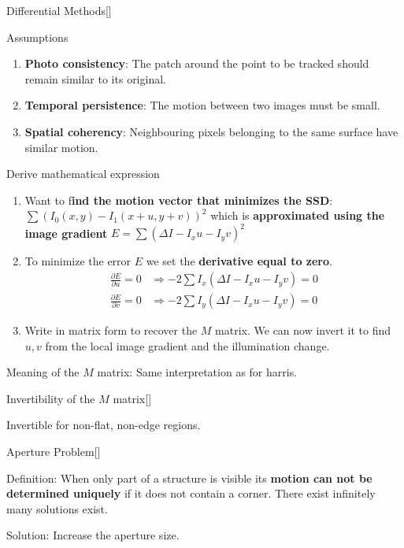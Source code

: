 \documentclass[10pt,a4paper]{scrartcl}
\begin{document}
\begin{multicols*}{2}
\begin{QandA}
{Differential Methods}[\Derivation]
\item Assumptions
\begin{enumerate}
\item \textbf{Photo consistency}: The patch around the point to be tracked should remain similar to its original.
\item \textbf{Temporal persistence}: The motion between two images must be small.
\item \textbf{Spatial coherency}: Neighbouring pixels belonging to the same surface have similar motion.
\end{enumerate}
\item Derive mathematical expression
\begin{enumerate}
\item Want to f\textbf{ind the motion vector that minimizes the SSD}: $\sum(I_0(x,y)-I_1(x+u,y+v))^2$ which is \textbf{approximated using the image gradient} $E = \sum(\Delta I-I_x u-I_y v)^2$
\item To minimize the error $E$ we set the \textbf{derivative equal to zero}.
\begin{align*}
\frac{\partial E}{\partial u}=0&\Rightarrow-2\sum I_x(\Delta I-I_xu-I_yv) = 0\\
\frac{\partial E}{\partial v}=0&\Rightarrow-2\sum I_y(\Delta I -I_xu-I_yv)=0
\end{align*}
\item Write in matrix form to recover the $M$ matrix. We can now invert it to find $u,v$ from the local image gradient and the illumination change.
\end{enumerate}
\item Meaning of the $M$ matrix: Same interpretation as for harris.
\end{QandA}

\begin{QandA}{Invertibility of the $M$ matrix}[\Derivation]
\item Invertible for non-flat, non-edge regions.
\end{QandA}

\begin{QandA}{Aperture Problem}[\Definition]
\item Definition: When only part of a structure is visible its \textbf{motion can not be determined uniquely} if it does not contain a corner. There exist infinitely many solutions exist.
\item Solution: Increase the aperture size.
\end{QandA}


\end{multicols*}
\end{document}
